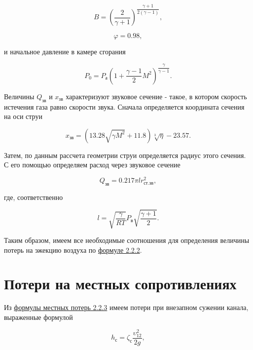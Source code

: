 \begin{equation}
    \label{eqn:LavalKoef2}
    B=(\dfrac{2}{\gamma+1})^{\dfrac{\gamma+1}{2(\gamma-1)}},
\end{equation}

\begin{equation}
    \label{eqn:LavalKoef1}
    \varphi=0.98,
\end{equation}

и начальное давление в камере сгорания

\begin{equation}
    \label{eqn:StartPressure}
    P_\text{0}=P_\text{а}(1+\dfrac{\gamma-1}{2} M^2)^{\dfrac{\gamma}{\gamma-1}}.
\end{equation}

Величины $Q_\text{зв}$ и $x_\text{зв}$ характеризуют звуковое сечение - такое, в котором скорость истечения газа равно скорости звука. Сначала определяется координата сечения на оси струи

\begin{equation}
    \label{eqn:SonicCoord}
    x_\text{зв}=(13.28 \sqrt{\gamma M^2} + 11.8) \sqrt[3]{\eta}-23.57.
\end{equation}

Затем, по данным рассчета геометрии струи определяется радиус этого сечения. С его помощью определяем расход через звуковое сечение

\begin{equation}
    \label{eqn:SonicConsumption}
    Q_\text{зв}=0.217 \pi l r_\text{ст.зв}^2,
\end{equation}

где, соответственно

\begin{equation}
    \label{eqn:SonicVelocity}
    l=\sqrt{\dfrac{\gamma}{RT}} P_\text{в} \sqrt{\dfrac{\gamma+1}{2}}.
\end{equation}

Таким образом, имеем все необходимые соотношения для определения величины потерь на эжекцию воздуха по \hyperref[eqn:EjectionLosses]{формуле 2.2.2}.

\section{Потери на местных сопротивлениях}
Из \hyperref[eqn:LocalLosses]{формулы местных потерь 2.2.3} имеем потери при внезапном сужении канала, выраженные формулой

\begin{equation}
    \label{eqn:ConstrictionLosses}
    h_\text{с}=\zeta_\text{с} \dfrac{\upsilon_{12}^2}{2g},
\end{equation}

